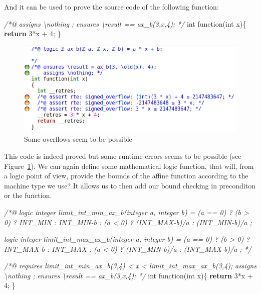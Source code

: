 \documentclass[12pt,francais,]{scrbook}
\newenvironment{Shaded}{}{}
\newcommand{\KeywordTok}[1]{\textcolor[rgb]{0.00,0.44,0.13}{\textbf{{#1}}}}
\newcommand{\DataTypeTok}[1]{\textcolor[rgb]{0.56,0.13,0.00}{{#1}}}
\newcommand{\DecValTok}[1]{\textcolor[rgb]{0.25,0.63,0.44}{{#1}}}
\newcommand{\CommentTok}[1]{\textcolor[rgb]{0.38,0.63,0.69}{\textit{{#1}}}}
\newcommand{\NormalTok}[1]{{#1}}
\begin{document}
And it can be used to prove the source code of the following function:

\begin{footnotesize}\begin{Shaded}
\begin{Highlighting}[]
\CommentTok{/*@ }
\CommentTok{  assigns \textbackslash{}nothing ;}
\CommentTok{  ensures \textbackslash{}result == ax_b(3,x,4); }
\CommentTok{*/}
\DataTypeTok{int} \NormalTok{function(}\DataTypeTok{int} \NormalTok{x)\{}
  \KeywordTok{return} \DecValTok{3}\NormalTok{*x + }\DecValTok{4}\NormalTok{;}
\NormalTok{\}}
\end{Highlighting}
\end{Shaded}\end{footnotesize}

\begin{figure}[htbp]
\centering
\includegraphics[scale=0.5]{4-3-affine-1.png}
\caption{Some overflows seem to be possible}
\label{fig:4-3-affine-1}
\end{figure}

This code is indeed proved but some runtime-errors seems to be possible
(see Figure~\ref{fig:4-3-affine-1}).
We can again define some mathematical logic function, that will, from a
logic point of view, provide the bounds of the affine function according
to the machine type we use? It allows us to then add our bound checking
in preconditon or the function.

\begin{footnotesize}\begin{Shaded}
\begin{Highlighting}[]
\CommentTok{/*@}
\CommentTok{  logic integer limit_int_min_ax_b(integer a, integer b) =}
\CommentTok{    (a == 0) ? (b > 0) ? INT_MIN : INT_MIN-b :}
\CommentTok{    (a <  0) ? (INT_MAX-b)/a :}
\CommentTok{               (INT_MIN-b)/a ;}

\CommentTok{  logic integer limit_int_max_ax_b(integer a, integer b) =}
\CommentTok{    (a == 0) ? (b > 0) ? INT_MAX-b : INT_MAX :}
\CommentTok{    (a <  0) ? (INT_MIN-b)/a :}
\CommentTok{               (INT_MAX-b)/a ;}
\CommentTok{*/}

\CommentTok{/*@}
\CommentTok{  requires limit_int_min_ax_b(3,4) < x < limit_int_max_ax_b(3,4);}
\CommentTok{  assigns \textbackslash{}nothing ;}
\CommentTok{  ensures \textbackslash{}result == ax_b(3,x,4);}
\CommentTok{*/}
\DataTypeTok{int} \NormalTok{function(}\DataTypeTok{int} \NormalTok{x)\{}
  \KeywordTok{return} \DecValTok{3}\NormalTok{*x + }\DecValTok{4}\NormalTok{;}
\NormalTok{\}}
\end{Highlighting}
\end{Shaded}\end{footnotesize}
\end{document}
